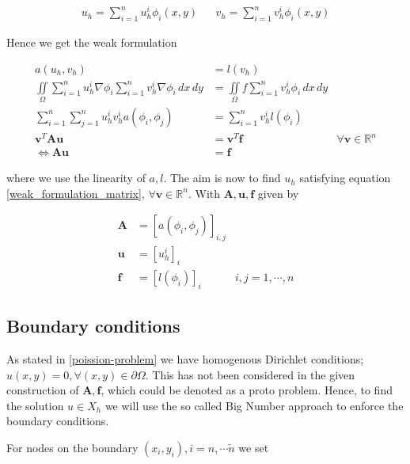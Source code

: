 \documentclass[5p,a4paper,english]{elsarticle}%
\begin{document}
\begin{equation*}
    \begin{aligned}
u_h = \sum_{i=1}^n u_h^i \phi_i(x,y) & & v_h = \sum_{i=1}^n v_h^i \phi_i(x,y) 
    \end{aligned}
\end{equation*}

Hence we get the weak formulation

\begin{equation}
\begin{aligned}
a(u_h,v_h) &= l(v_h) 
\\
\iint\limits_{\Omega} 
\sum_{i=1}^n u_h^i \nabla \phi_i \sum_{i=1}^n v_h^i \nabla\phi_i \, dx \, dy 
&= \iint\limits_{\Omega} f \sum_{i=1}^n v_h^i \phi_i \, dx \, dy
\\
\sum_{i=1}^n\sum_{j=1}^n u_h^i v_h^i a(\phi_i,\phi_j) &= \sum_{i=1}^n v_h^i l(\phi_i)
\\
\bm v^T\bm A \bm u &= \bm v^T \bm f & \forall \bm v \in \mathbb R^n
\\
\iff \bm A \bm u &= \bm f
\label{weak_formulation_matrix}
\end{aligned}
\end{equation}


\noindent where we use the linearity of $a,l$. 
The aim is now to find $u_h$ satisfying equation \eqref{weak_formulation_matrix}, $\forall \bm v \in \mathbb R^n$.
With $\bm A, \bm u, \bm f$ given by

\begin{equation}
    \begin{aligned}
\bm A &= [a(\phi_i,\phi_j)]_{i,j}
\\ 
\bm u &= [u_h^i]_i
\\
\bm f &= [l(\phi_i)]_i & i,j = 1,\cdots,n
\end{aligned}
\end{equation}

\subsection{Boundary conditions}

As stated in \eqref{poission-problem} we have homogenous Dirichlet conditions; $u(x,y) = 0, \forall (x,y) \in \partial \Omega$.
This has not been considered in the given construction of $\bm A,\bm f$, which could be denoted as a proto problem.
Hence, to find the solution $u \in X_h$ we will use the so called Big Number approach to enforce the boundary conditions.

For nodes on the boundary $(x_i,y_i), i=n,\cdots\tilde n$ we set
\end{document}
